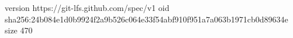 version https://git-lfs.github.com/spec/v1
oid sha256:24b084e1d0b9924f2a9b526c064e33f54abf910f951a7a063b1971cb0d89634e
size 470
